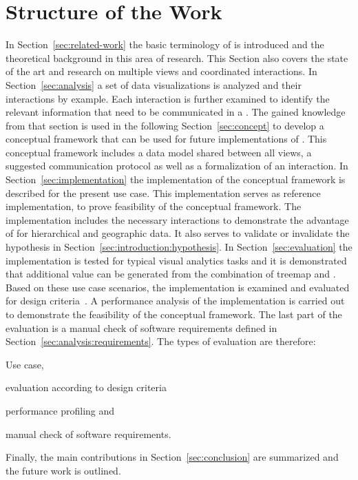 \section{Structure of the Work}

In Section~\ref{sec:related-work} the basic terminology of \cmvs{} is introduced and the theoretical background in this area of research.
This Section also covers the state of the art and research on multiple views and coordinated interactions.
In Section~\ref{sec:analysis} a set of data visualizations is analyzed and their interactions by example.
Each interaction is further examined to identify the relevant information that need to be communicated in a \cmv{}.
The gained knowledge from that section is used in the following Section~\ref{sec:concept} to develop a conceptual framework that can be used for future implementations of \cmvs{}.
This conceptual framework includes a data model shared between all views, a suggested communication protocol as well as a formalization of an interaction.
In Section~\ref{sec:implementation} the implementation of the conceptual framework is described for the present use case.
This implementation serves as reference implementation, to prove feasibility of the conceptual framework.
The implementation includes the necessary interactions to demonstrate the advantage of \cmvs{} for hierarchical and geographic data.
It also serves to validate or invalidate the hypothesis in Section~\ref{sec:introduction:hypothesis}.
In Section~\ref{sec:evaluation} the implementation is tested for typical visual analytics tasks and it is demonstrated that additional value can be generated from the combination of treemap and \gv{}.
Based on these use case scenarios, the \cmv{} implementation is examined and evaluated for design criteria~\parencite{Baldonado2000}.
A performance analysis of the implementation is carried out to demonstrate the feasibility of the conceptual framework.
The last part of the evaluation is a manual check of software requirements defined in Section~\ref{sec:analysis:requirements}.
The types of evaluation are therefore:

\begin{enumerate*}[label=(\arabic*)]
  \item Use case,
  \item evaluation according to design criteria
  \item performance profiling and
  \item manual check of software requirements.
\end{enumerate*}

Finally, the main contributions in Section~\ref{sec:conclusion} are summarized and the future work is outlined.

